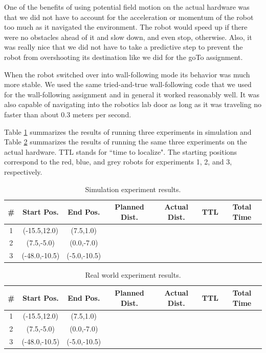 \documentclass[12pt]{article}
\begin{document}
One of the benefits of using potential field motion on the actual hardware was that we did not have to account for the acceleration or momentum of the robot too much as it navigated the environment. The robot would speed up if there were no obstacles ahead of it and slow down, and even stop, otherwise. Also, it was really nice that we did not have to take a predictive step to prevent the robot from overshooting its destination like we did for the goTo assignment.

When the robot switched over into wall-following mode its behavior was much more stable. We used the same tried-and-true wall-following code that we used for the wall-following assignment and in general it worked reasonably well. It was also capable of navigating into the robotics lab door as long as it was traveling no faster than about 0.3 meters per second.

Table \ref{tab:simresults} summarizes the results of running three experiments in simulation and Table \ref{tab:realresults} summarizes the results of running the same three experiments on the actual hardware. TTL stands for ``time to localize". The starting positions correspond to the red, blue, and grey robots for experiments 1, 2, and 3, respectively. \\

\begin{table}[h]
\centering
\begin{tabular}{| c | c | c | c | c | c | c |}
\hline
{\#} & Start Pos. & End Pos. & Planned Dist. & Actual Dist. & TTL & Total Time \\
\hline 
1 & (-15.5,12.0) & (7.5,1.0) & & & & \\
\hline 
2 & (7.5,-5.0) & (0.0,-7.0) & & & & \\
\hline 
3 & (-48.0,-10.5) & (-5.0,-10.5) & & & & \\
\hline
\end{tabular}
\caption{Simulation experiment results.}
\label{tab:simresults}
\end{table}

\newpage

\begin{table}[h]
\centering
\begin{tabular}{| c | c | c | c | c | c | c |}
\hline
{\#} & Start Pos. & End Pos. & Planned Dist. & Actual Dist. & TTL & Total Time \\ 
\hline 
1 & (-15.5,12.0) & (7.5,1.0) & & & & \\
\hline 
2 & (7.5,-5.0) & (0.0,-7.0) & & & & \\
\hline 
3 & (-48.0,-10.5) & (-5.0,-10.5) & & & & \\
\hline
\end{tabular}
\caption{Real world experiment results.}
\label{tab:realresults}
\end{table}
\end{document}
